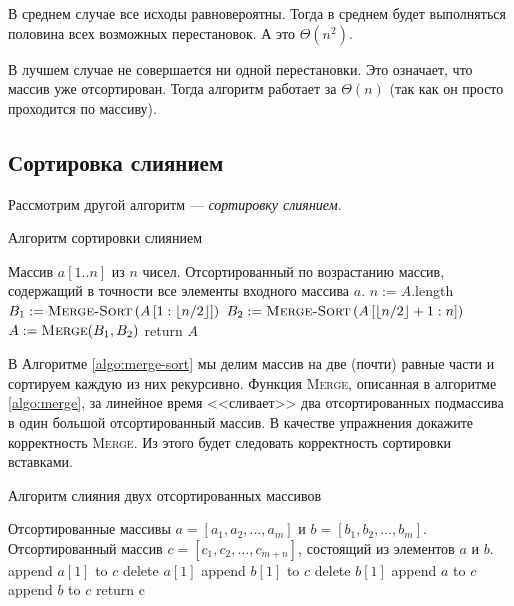 \documentclass[a4paper,12pt]{article}
\newcommand{\algname}[1]{\textsc{#1}}
\begin{document}
		В среднем случае все исходы равновероятны. Тогда в среднем будет выполняться половина всех возможных перестановок. А это \(\Theta(n^2)\).
		
		В лучшем случае не совершается ни одной перестановки. Это означает, что массив уже отсортирован. Тогда алгоритм работает за \(\Theta(n)\) (так как он просто проходится по массиву).
		
\subsection{Сортировка слиянием}
Рассмотрим другой алгоритм --- \emph{сортировку слиянием}.

\begin{algorithm}[H]
	\caption{Алгоритм сортировки слиянием}
	\label{algo:merge-sort}
	\begin{algorithmic}[1]
		\Require Массив $a[1..n]$ из $n$ чисел. 
		\Ensure Отсортированный по возрастанию массив, содержащий в точности все элементы входного массива $a$.
		\State \(n \mathrel{:=} A.\)length
		\State \(B_1 \mathrel{:=} \textsc{Merge-Sort}\left(A\left[1: \lfloor n/2 \rfloor\right]\right)\)
		\State \(B_2 \mathrel{:=} \textsc{Merge-Sort}\left(A\left[\lfloor n/2 \rfloor + 1 : n\right]\right)\)
		\State \(A \mathrel{:=} \textsc{Merge}(B_1, B_2)\) 
		\EndIf
		\State return \(A\)
		\EndFunction
	\end{algorithmic}
\end{algorithm}

В Алгоритме \ref{algo:merge-sort} мы делим массив на две (почти) равные части и сортируем каждую из них рекурсивно.
Функция \algname{Merge}, описанная в алгоритме \ref{algo:merge}, за линейное время <<сливает>> два отсортированных подмассива в один большой отсортированный массив. В качестве упражнения докажите корректность \algname{Merge}. Из этого будет следовать корректность сортировки вставками.
\begin{algorithm}[H]
	\caption{Алгоритм слияния двух отсортированных массивов}
	\label{algo:merge}
	\begin{algorithmic}[1]
		\Require Отсортированные массивы \(a = [a_1, a_2, \ldots, a_m]\) и \(b = [b_1, b_2, \ldots, b_m]\).
		\Ensure Отсортированный массив \(c = [c_1, c_2, \ldots, c_{m + n}]\), состоящий из элементов \(a\) и \(b\).
				\State append \(a[1]\) to \(c\)
				\State delete \(a[1]\)
			\Else
				\State append \(b[1]\) to \(c\)
				\State delete \(b[1]\)
			\EndIf
		\EndWhile
			\State append \(a\) to \(c\)
		\Else
			\State append \(b\) to \(c\)
		\EndIf
		\State return c
		\EndFunction
	\end{algorithmic}
\end{algorithm}
\end{document}
